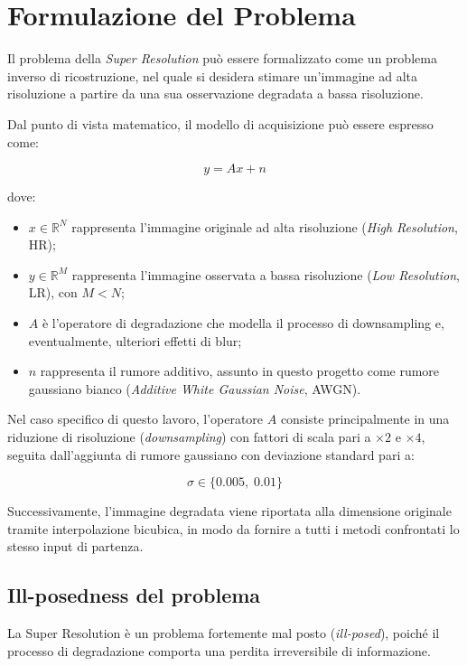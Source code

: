 \documentclass{article}
\begin{document}
\newpage
\section{Formulazione del Problema}

Il problema della \textit{Super Resolution} può essere formalizzato come un problema inverso di ricostruzione, nel quale si desidera stimare un’immagine ad alta risoluzione a partire da una sua osservazione degradata a bassa risoluzione.

Dal punto di vista matematico, il modello di acquisizione può essere espresso come:

\[
y = Ax + n
\]

dove:

\begin{itemize}
    \item \(x \in \mathbb{R}^{N}\) rappresenta l’immagine originale ad alta risoluzione (\textit{High Resolution}, HR);
    \item \(y \in \mathbb{R}^{M}\) rappresenta l’immagine osservata a bassa risoluzione (\textit{Low Resolution}, LR), con \(M < N\);
    \item \(A\) è l’operatore di degradazione che modella il processo di downsampling e, eventualmente, ulteriori effetti di blur;
    \item \(n\) rappresenta il rumore additivo, assunto in questo progetto come rumore gaussiano bianco (\textit{Additive White Gaussian Noise}, AWGN).
\end{itemize}

Nel caso specifico di questo lavoro, l’operatore \(A\) consiste principalmente in una riduzione di risoluzione (\textit{downsampling}) con fattori di scala pari a \(\times 2\) e \(\times 4\), seguita dall’aggiunta di rumore gaussiano con deviazione standard pari a:

\[
\sigma \in \{0.005,\; 0.01\}
\]

Successivamente, l’immagine degradata viene riportata alla dimensione originale tramite interpolazione bicubica, in modo da fornire a tutti i metodi confrontati lo stesso input di partenza.

\subsection{Ill-posedness del problema}

La Super Resolution è un problema fortemente mal posto (\textit{ill-posed}), poiché il processo di degradazione comporta una perdita irreversibile di informazione.
\end{document}
